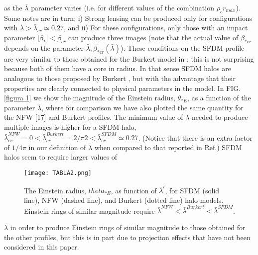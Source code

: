 \documentclass[%
 twocolumn,
 amsmath,amssymb,
 aps,
]{revtex4-2}
\begin{document}
as the $\bar{\lambda}$ parameter varies (i.e. for different values of the
combination $\rho_{c}r_{max}$). Some notes are in turn: i) Strong
lensing can be produced only for configurations with $\lambda >\bar{\lambda}_{cr}\simeq  0.27$, and ii) For these configurations, only those
with an impact parameter $\mid\beta_{\ast}\mid < \beta_{cr}$ can produce three
images (note that the actual value of $\beta_{\ast cr}$ depends on the
parameter $\bar{\lambda}, \beta_{\ast cr}(\bar{\lambda})$).
These conditions on the SFDM profile are very similar
to those obtained for the Burkert model in ; this is not
surprising because both of them have a core in radius. In
that sense SFDM halos are analogous to those proposed
by Burkert , but with the advantage that their properties are clearly connected to physical parameters in the
model.
In FIG.\ref{figura 1} we show the magnitude of the Einstein radius, $\theta_{\ast E}$, as a function of the parameter $\bar{\lambda}$, where for
comparison we have also plotted the same quantity for
the NFW [17] and Burkert profiles. The minimum
value of $\bar{\lambda}$ needed to produce multiple images is higher for
a SFDM halo, $\bar{\lambda}^{NFW}_{cr} = 0 < \bar{\lambda}^{Burkert}_{cr} = 2/\pi 2 < \bar{\lambda}^{SFDM}_{cr} \simeq 0.27$. (Notice that there is an extra factor of $1/4\pi$ in
our definition of $\bar{\lambda}$ when compared to that reported in
Ref.) SFDM halos seem to require larger values of
\begin{figure}[h]
    \centering
    \texttt{[image: TABLA2.png]}
    \centering
    \caption{The Einstein radius, $theta_{\ast E}$, as function of $\bar{\lambda}^{i}$, for
SFDM (solid line), NFW (dashed line), and Burkert (dotted
line) halo models. Einstein rings of similar magnitude require
$\bar{\lambda}^{NFW} < \bar{\lambda}^{Burkert} < \bar{\lambda}^{SFDM}$.}
    \label{figura 2}
\end{figure}
 $\bar{\lambda}$ in order to produce Einstein rings of similar magnitude
to those obtained for the other profiles, but this is in part
due to projection effects that have not been considered
in this paper.
\end{document}
